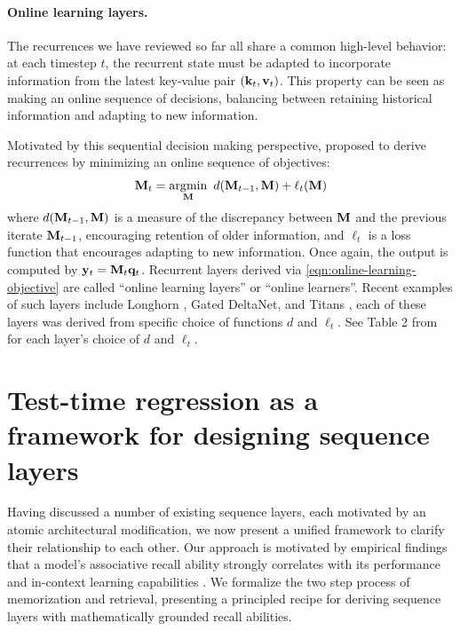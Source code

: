 \documentclass[notitlepage, 11pt]{article}
\begin{document}
\paragraph{Online learning layers.}
The recurrences we have reviewed so far all share a common high-level behavior: at each timestep $t$, the recurrent state must be adapted to incorporate information from the latest key-value pair $(\mathbf{k}_t, \mathbf{v}_t)$.
This property can be seen as making an online sequence of decisions, balancing between retaining historical information and adapting to new information.

Motivated by this sequential decision making perspective, \citet{Liu2024LonghornStateSpace} proposed to derive recurrences by minimizing an online sequence of objectives:
\begin{align}
    \mathbf{M}_t = \operatorname*{\arg\!\min}_{\mathbf{M}}\ d(\mathbf{M}_{t-1}, \mathbf{M}) + \ell_t(\mathbf{M}) \label{eqn:online-learning-objective}
\end{align}
where $d(\mathbf{M}_{t-1}, \mathbf{M})$ is a measure of the discrepancy between $\mathbf{M}$ and the previous iterate $\mathbf{M}_{t-1}$, encouraging retention of older information, and $\ell_t$ is a loss function that encourages adapting to new information.
Once again, the output is computed by $\mathbf{y}_t = \mathbf{M}_t\mathbf{q}_t$.
Recurrent layers derived via \autoref{eqn:online-learning-objective} are called ``online learning layers'' or ``online learners''.
Recent examples of such layers include Longhorn \citep{Liu2024LonghornStateSpace}, Gated DeltaNet\citep{Yang2024GatedDeltaNetworks}, and Titans \citep{Behrouz2024TitansLearningMemorize}, each of these layers was derived from specific choice of functions $d$ and $\ell_t$. See Table 2 from \citet{Yang2024GatedDeltaNetworks} for each layer's choice of $d$ and $\ell_t$.

\section{Test-time regression as a framework for designing sequence layers}\label{sec:duality}
Having discussed a number of existing sequence layers, each motivated by an atomic architectural modification, we now present a unified framework to clarify their relationship to each other.
Our approach is motivated by empirical findings that a model's associative recall ability strongly correlates with its performance and in-context learning capabilities \citep{Olsson2022ContextLearningInduction, Arora2023ZoologyMeasuringImproving}.
We formalize the two step process of memorization and retrieval, presenting a principled recipe for deriving sequence layers with mathematically grounded recall abilities.
\end{document}
